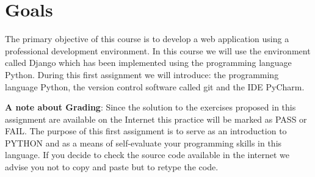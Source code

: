 \documentclass[12pt]{article} %
\begin{document}

\tableofcontents %

\newpage %


\section {Goals}

The primary objective of this course is to develop a web application using a professional development environment. In this course we will use the environment called Django which has been implemented using the programming language Python. During this first assignment we will introduce: the programming language Python, the version control software called git and the IDE PyCharm. 





\textbf{A note about Grading}: Since the solution to the exercises proposed in this assignment are available on the Internet this practice will be marked as PASS or FAIL. The purpose of this first assignment is to serve as an introduction to PYTHON and as a means of self-evaluate your programming skills in this language. If you decide to check the source code available in the internet we advise you not to copy and paste but to retype the code.
\end{document}
